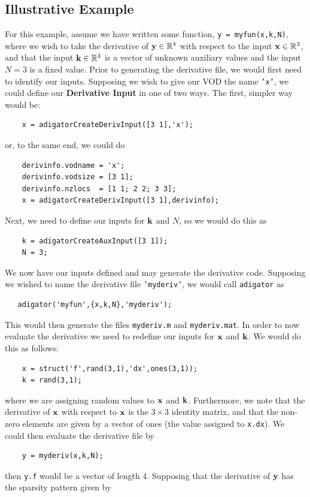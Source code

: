 \documentclass[10pt,pdftex]{article}
\begin{document}
\subsection{Illustrative Example}
For this example, assume we have written some function, \texttt{y = myfun(x,k,N)}, where we wish to take the derivative of $\mathbf{y} \in \mathbb{R}^4$ with respect to the input $\mathbf{x} \in \mathbb{R}^3$, and that the input $\textbf{k} \in \mathbb{R}^3$ is a vector of unknown auxiliary values and the input $N = 3$ is a fixed value. Prior to generating the derivative file, we would first need to identify our inputs. Supposing we wish to give our VOD the name \texttt{'x'}, we could define our {\bf Derivative Input} in one of two ways. The first, simpler way would be:
\begin{verbatim}
    x = adigatorCreateDerivInput([3 1],'x');
\end{verbatim}
or, to the same end, we could do
\begin{verbatim}
    derivinfo.vodname = 'x';
    derivinfo.vodsize = [3 1];
    derivinfo.nzlocs  = [1 1; 2 2; 3 3];
    x = adigatorCreateDerivInput([3 1],derivinfo);
\end{verbatim}
Next, we need to define our inputs for $\textbf{k}$ and $N$, so we would do this as
\begin{verbatim}
    k = adigatorCreateAuxInput([3 1]);
    N = 3;
\end{verbatim}
We now have our inputs defined and may generate the derivative code. Supposing we wished to name the derivative file \texttt{'myderiv'}, we would call \texttt{adigator} as
\begin{verbatim}
   adigator('myfun',{x,k,N},'myderiv');
\end{verbatim}
This would then generate the files \texttt{myderiv.m} and \texttt{myderiv.mat}. In order to now evaluate the derivative we need to redefine our inputs for $\mathbf{x}$ and $\textbf{k}$. We would do this as follows:
\begin{verbatim}
    x = struct('f',rand(3,1),'dx',ones(3,1));
    k = rand(3,1);
\end{verbatim}
where we are assigning random values to $\mathbf{x}$ and $\textbf{k}$. Furthermore, we note  that the derivative of $\mathbf{x}$ with respect to $\mathbf{x}$ is the $3\times 3$ identity matrix, and that the non-zero elements are given by a vector of ones (the value assigned to \texttt{x.dx}). We could then evaluate the derivative file by
\begin{verbatim}
    y = myderiv(x,k,N);
\end{verbatim}
then \texttt{y.f} would be a vector of length 4. Supposing that the derivative of $\mathbf{y}$ has the sparsity pattern given by
\end{document}
